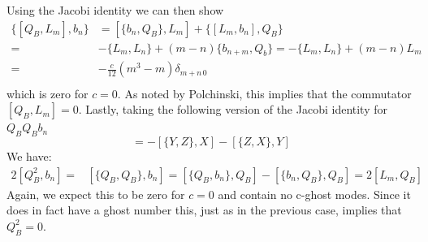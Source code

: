 \documentclass[a4paper,10pt]{article}
\renewcommand\[{\begin{equation*}}
\renewcommand\]{\end{equation*}}
\numberwithin{equation}{section}
\begin{document}
Using the Jacobi identity we can then show
\begin{equation}
	\begin{aligned}
		\{[Q_B,L_m],b_n\}&=[\{b_n,Q_B\},L_m]+\{[L_m,b_n],Q_B\}\\
		=&-\{L_m,L_n\}+(m-n)\{b_{n+m},Q_b\}=-\{L_m,L_n\}+(m-n)L_m\\
		=&-\frac{c}{12}(m^3-m)\delta_{m+n\, 0}\\
	\end{aligned}
\end{equation}
which is zero for $c=0$. As noted by Polchinski, this implies that the commutator $[Q_B,L_m]=0$. Lastly, taking the following version of  the Jacobi identity for $Q_BQ_Bb_n$
\begin{equation}
	[\{X,Y\},Z]=-[\{Y,Z\},X]-[\{Z,X\},Y]
\end{equation}
We have:
\begin{equation}
	\begin{aligned}
		2[Q_B^2,b_n] =&
		[\{Q_B,Q_B\},b_n]=[\{Q_B,b_n\},Q_B]-[\{b_n,Q_B\},Q_B]=2[L_m,Q_B]
	\end{aligned}
\end{equation}
Again, we expect this to be zero for $c=0$ and contain no c-ghost modes. Since it does in fact have a ghost number this, just as in the previous case, implies that $Q_B^2=0$. 
\end{document}
